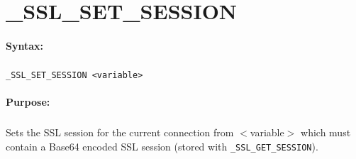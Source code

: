 
\newpage
\section{\_SSL\_SET\_SESSION}
\label{cmd:_SSL_SET_SESSION}

\paragraph{Syntax:}
\subparagraph{}
\texttt{\_SSL\_SET\_SESSION <variable>}

\paragraph{Purpose:}
\subparagraph{}
Sets the SSL session for the current connection from $<$variable$>$ 
which must contain a Base64 encoded SSL session (stored with 
\texttt{\_SSL\_GET\_SESSION}).